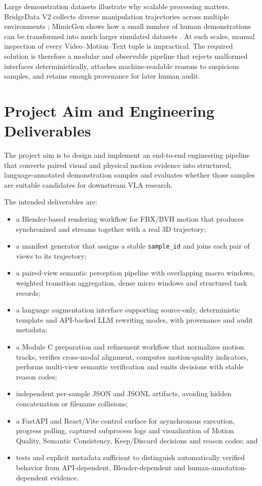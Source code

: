 \documentclass[11pt,oneside]{report}
\begin{document}
Large demonstration datasets illustrate why scalable processing matters.
BridgeData V2 collects diverse manipulation trajectories across multiple
environments \cite{walke2023bridgedatav2}; MimicGen shows how a small number of
human demonstrations can be transformed into much larger simulated datasets
\cite{mandlekar2023mimicgen}. At such scales, manual inspection of every
Video--Motion--Text tuple is impractical. The required solution is therefore a
modular and observable pipeline that rejects malformed interfaces
deterministically, attaches machine-readable reasons to suspicious samples, and
retains enough provenance for later human audit.

\section{Project Aim and Engineering Deliverables}
The project aim is to design and implement an end-to-end engineering pipeline
that converts paired visual and physical motion evidence into structured,
language-annotated demonstration samples and evaluates whether those samples
are suitable candidates for downstream VLA research.

The intended deliverables are:

\begin{itemize}
    \item a Blender-based rendering workflow for FBX/BVH motion that produces
    synchronized  and
     streams together with a real 3D trajectory;
    \item a manifest generator that assigns a stable \texttt{sample\_id} and
    joins each pair of views to its trajectory;
    \item a paired-view semantic perception pipeline with overlapping macro
    windows, weighted transition aggregation, dense micro windows and
    structured task records;
    \item a language augmentation interface supporting source-only,
    deterministic template and API-backed LLM rewriting modes, with provenance
    and audit metadata;
    \item a Module C preparation and refinement workflow that normalizes motion
    tracks, verifies cross-modal alignment, computes motion-quality indicators,
    performs multi-view semantic verification and emits decisions with stable
    reason codes;
    \item independent per-sample JSON and JSONL artifacts, avoiding hidden
    concatenation or filename collisions;
    \item a FastAPI and React/Vite control surface for asynchronous execution,
    progress polling, captured subprocess logs and visualization of Motion
    Quality, Semantic Consistency, Keep/Discard decisions and reason codes; and
    \item tests and explicit metadata sufficient to distinguish automatically
    verified behavior from API-dependent, Blender-dependent and
    human-annotation-dependent evidence.
\end{itemize}
\end{document}
